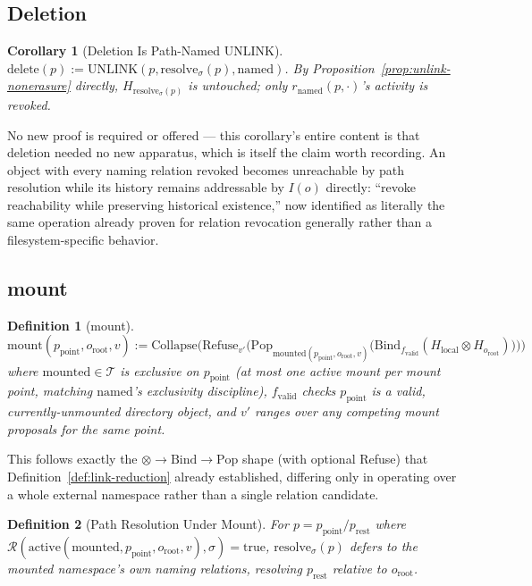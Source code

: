 \documentclass[11pt]{article}
\newtheorem{definition}{Definition}[section]
\newtheorem{corollary}{Corollary}[section]
\begin{document}
\subsection{Deletion}

\begin{corollary}[Deletion Is Path-Named UNLINK]
\label{cor:deletion-unlink}
$\mathrm{delete}(p) := \mathrm{UNLINK}(p, \mathrm{resolve}_\sigma(p), \mathrm{named})$. By Proposition~\ref{prop:unlink-nonerasure} directly, $H_{\mathrm{resolve}_\sigma(p)}$ is untouched; only $r_{\mathrm{named}}(p,\cdot)$'s activity is revoked.
\end{corollary}

No new proof is required or offered --- this corollary's entire content is that deletion needed no new apparatus, which is itself the claim worth recording. An object with every naming relation revoked becomes unreachable by path resolution while its history remains addressable by $I(o)$ directly: ``revoke reachability while preserving historical existence,'' now identified as literally the same operation already proven for relation revocation generally rather than a filesystem-specific behavior.

\subsection{mount}

\begin{definition}[mount]
\label{def:mount-v2}
\[
\mathrm{mount}(p_{\mathrm{point}}, o_{\mathrm{root}}, v) :=
\mathrm{Collapse}\Big(
\mathrm{Refuse}_{v'}\big(
\mathrm{Pop}_{\mathrm{mounted}(p_{\mathrm{point}},o_{\mathrm{root}},v)}\big(
\mathrm{Bind}_{f_{\mathrm{valid}}}(H_{\mathrm{local}} \otimes H_{o_{\mathrm{root}}})
\big)
\big)
\Big)
\]
where $\mathrm{mounted} \in \mathcal{T}$ is exclusive on $p_{\mathrm{point}}$ (at most one active mount per mount point, matching $\mathrm{named}$'s exclusivity discipline), $f_{\mathrm{valid}}$ checks $p_{\mathrm{point}}$ is a valid, currently-unmounted directory object, and $v'$ ranges over any competing mount proposals for the same point.
\end{definition}

This follows exactly the $\otimes \to \mathrm{Bind} \to \mathrm{Pop}$ shape (with optional Refuse) that Definition~\ref{def:link-reduction} already established, differing only in operating over a whole external namespace rather than a single relation candidate.

\begin{definition}[Path Resolution Under Mount]
\label{def:resolve-mount}
For $p = p_{\mathrm{point}} / p_{\mathrm{rest}}$ where $\mathcal{R}(\mathrm{active}(\mathrm{mounted}, p_{\mathrm{point}}, o_{\mathrm{root}}, v), \sigma) = \mathrm{true}$, $\mathrm{resolve}_\sigma(p)$ defers to the mounted namespace's own naming relations, resolving $p_{\mathrm{rest}}$ relative to $o_{\mathrm{root}}$.
\end{definition}
\end{document}
